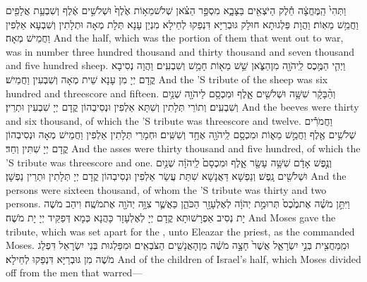 {וַתְּהִי֙ הַֽמֶּחֱצָ֔ה חֵ֕לֶק הַיֹּצְאִ֖ים בַּצָּבָ֑א מִסְפַּ֣ר הַצֹּ֗אן שְׁלֹשׁ\maqqaf מֵא֥וֹת אֶ֙לֶף֙ וּשְׁלֹשִׁ֣ים אֶ֔לֶף וְשִׁבְעַ֥ת אֲלָפִ֖ים וַחֲמֵ֥שׁ מֵאֽוֹת׃}
{וַהֲוָת פַּלְגוּתָא חוּלָק גּוּבְרַיָּא דִּנְפַקוּ לְחֵילָא מִנְיַן עָנָא תְּלָת מְאָה וּתְלָתִין וְשִׁבְעָא אַלְפִין וַחֲמֵישׁ מְאָה׃}
{And the half, which was the portion of them that went out to war, was in number three hundred thousand and thirty thousand and seven thousand and five hundred sheep.}{}
{וַיְהִ֛י הַמֶּ֥כֶס לַֽיהֹוָ֖ה מִן\maqqaf הַצֹּ֑אן שֵׁ֥שׁ מֵא֖וֹת חָמֵ֥שׁ וְשִׁבְעִֽים׃}
{וַהֲוָה נְסִיבָא קֳדָם יְיָ מִן עָנָא שֵׁית מְאָה וְשִׁבְעִין וַחֲמֵישׁ׃}
{And the \lord’S tribute of the sheep was six hundred and threescore and fifteen.}{}
{וְהַ֨בָּקָ֔ר שִׁשָּׁ֥ה וּשְׁלֹשִׁ֖ים אָ֑לֶף וּמִכְסָ֥ם לַיהֹוָ֖ה שְׁנַ֥יִם וְשִׁבְעִֽים׃}
{וְתוֹרֵי תְּלָתִין וְשִׁתָּא אַלְפִין וּנְסִיבְהוֹן קֳדָם יְיָ שִׁבְעִין וּתְרֵין׃}
{And the beeves were thirty and six thousand, of which the \lord’S tribute was threescore and twelve.}{}
{וַחֲמֹרִ֕ים שְׁלֹשִׁ֥ים אֶ֖לֶף וַחֲמֵ֣שׁ מֵא֑וֹת וּמִכְסָ֥ם לַֽיהֹוָ֖ה אֶחָ֥ד וְשִׁשִּֽׁים׃}
{וּחְמָרֵי תְּלָתִין אַלְפִין וַחֲמֵישׁ מְאָה וּנְסִיבְהוֹן קֳדָם יְיָ שִׁתִּין וְחַד׃}
{And the asses were thirty thousand and five hundred, of which the \lord’S tribute was threescore and one.}{}
{וְנֶ֣פֶשׁ אָדָ֔ם שִׁשָּׁ֥ה עָשָׂ֖ר אָ֑לֶף וּמִכְסָם֙ לַֽיהֹוָ֔ה שְׁנַ֥יִם וּשְׁלֹשִׁ֖ים נָֽפֶשׁ׃}
{וְנַפְשָׁא דַּאֲנָשָׁא שִׁתַּת עֲשַׂר אַלְפִין וּנְסִיבְהוֹן קֳדָם יְיָ תְּלָתִין וּתְרֵין נַפְשָׁן׃}
{And the persons were sixteen thousand, of whom the \lord’S tribute was thirty and two persons.}{}
{וַיִּתֵּ֣ן מֹשֶׁ֗ה אֶת\maqqaf מֶ֙כֶס֙ תְּרוּמַ֣ת יְהֹוָ֔ה לְאֶלְעָזָ֖ר הַכֹּהֵ֑ן כַּאֲשֶׁ֛ר צִוָּ֥ה יְהֹוָ֖ה אֶת\maqqaf מֹשֶֽׁה׃}
{וִיהַב מֹשֶׁה יָת נְסִיב אַפְרָשׁוּתָא קֳדָם יְיָ לְאֶלְעָזָר כָּהֲנָא כְּמָא דְּפַקֵּיד יְיָ יָת מֹשֶׁה׃}
{And Moses gave the tribute, which was set apart for the \lord, unto Eleazar the priest, as the \lord\space commanded Moses.}{}
{וּמִֽמַּחֲצִ֖ית בְּנֵ֣י יִשְׂרָאֵ֑ל אֲשֶׁר֙ חָצָ֣ה מֹשֶׁ֔ה מִן\maqqaf הָאֲנָשִׁ֖ים הַצֹּבְאִֽים׃}
{וּמִפַּלְגוּת בְּנֵי יִשְׂרָאֵל דִּפְלַג מֹשֶׁה מִן גּוּבְרַיָּא דִּנְפַקוּ לְחֵילָא׃}
{And of the children of Israel’s half, which Moses divided off from the men that warred—}{}
